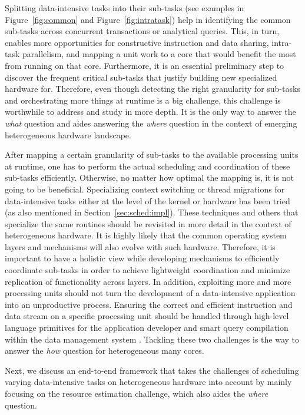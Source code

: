 \documentclass[11pt,dvipdfm]{article}
\newcommand{\reffig}[1]{Figure~\ref{fig:#1}}
\newcommand{\refsec}[1]{Section~\ref{sec:#1}}
\begin{document}
Splitting data-intensive tasks into their sub-tasks
(see examples in \reffig{common} and \reffig{intratask})
help in identifying the common sub-tasks across concurrent transactions or analytical queries.
This, in turn, enables more opportunities for constructive instruction and data sharing,
intra-task parallelism, and mapping a unit work to a core that would benefit the most from running on that core.
Furthermore, it is an essential preliminary step to 
discover the frequent critical sub-tasks that justify building new specialized hardware for.
Therefore,
even though detecting the right granularity for sub-tasks and orchestrating more things at runtime is a big challenge,
this challenge is worthwhile to address and study in more depth.
It is the only way to answer the \textit{what} question and aides answering the \textit{where} question
in the context of emerging heterogeneous hardware landscape.

After mapping a certain granularity of sub-tasks to the available processing units at runtime,
one has to perform the actual scheduling and coordination of these sub-tasks efficiently.
Otherwise, no matter how optimal the mapping is, it is not going to be beneficial.
Specializing context switching or thread migrations for data-intensive tasks
either at the level of the kernel or hardware has been tried (as also mentioned in \refsec{sched:impl}).
These techniques and others that specialize the same routines
should be revisited in more detail in the context of heterogeneous hardware.
It is highly likely that the common operating system layers and mechanisms will also evolve with such hardware.
Therefore, it is important to have a holistic view while developing mechanisms to efficiently coordinate sub-tasks
in order to achieve lightweight coordination and minimize replication of functionality across layers.
In addition, exploiting more and more processing units should not turn the development
of a data-intensive application into an unproductive process.
Ensuring the correct and efficient instruction and data stream on a specific processing unit should be handled through
high-level language primitives for the application developer and smart query compilation within the data management system
\cite{HeimelSPMM13}.
Tackling these two challenges is the way to answer the \textit{how} question for heterogeneous many cores.

Next, we discuss an end-to-end framework that takes the challenges of scheduling varying data-intensive tasks
on heterogeneous hardware into account by mainly focusing on the resource estimation challenge,
which also aides the \textit{where} question.
\end{document}
